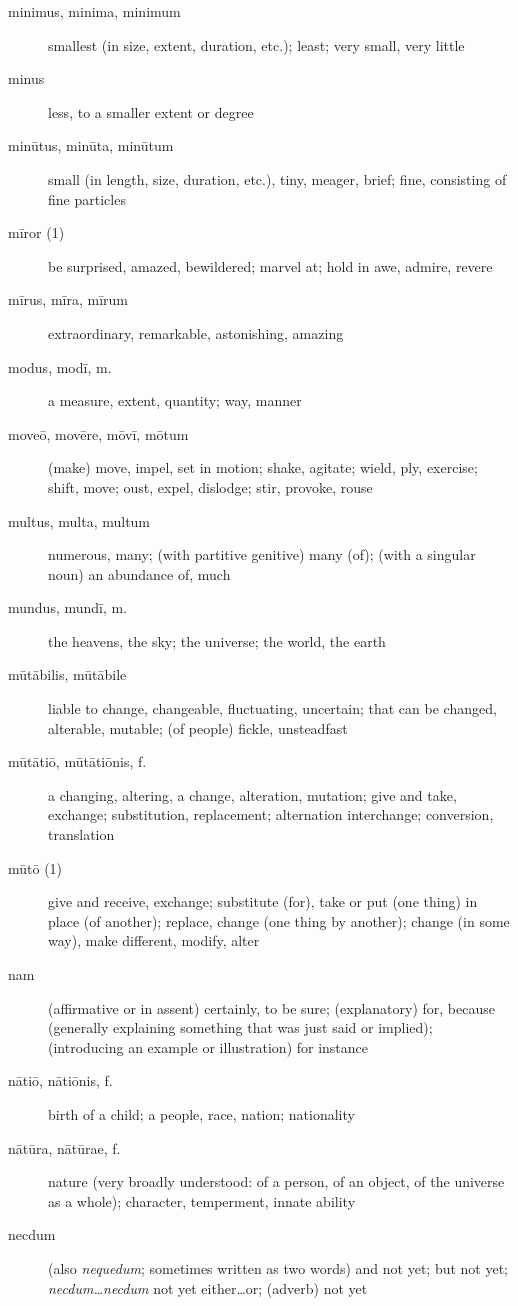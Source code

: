 \begin{description}
    \item[minimus, minima, minimum] smallest (in size, extent, duration, etc.); least; very small, very little
    \item[minus] less, to a smaller extent or degree
    \item[minūtus, minūta, minūtum] small (in length, size, duration, etc.), tiny, meager, brief; fine, consisting of fine particles
    \item[mīror (1)] be surprised, amazed, bewildered; marvel at; hold in awe, admire, revere
    \item[mīrus, mīra, mīrum] extraordinary, remarkable, astonishing, amazing
    \item[modus, modī, m.] a measure, extent, quantity; way, manner
    \item[moveō, movēre, mōvī, mōtum] (make) move, impel, set in motion; shake, agitate; wield, ply, exercise; shift, move; oust, expel, dislodge; stir, provoke, rouse
    \item[multus, multa, multum] numerous, many; (with partitive genitive) many (of); (with a singular noun) an abundance of, much
    \item[mundus, mundī, m.] the heavens, the sky; the universe; the world, the earth
    \item[mūtābilis, mūtābile] liable to change, changeable, fluctuating, uncertain; that can be changed, alterable, mutable; (of people) fickle, unsteadfast
    \item[mūtātiō, mūtātiōnis, f.] a changing, altering, a change, alteration, mutation; give and take, exchange; substitution, replacement; alternation interchange; conversion, translation
    \item[mūtō (1)] give and receive, exchange; substitute (for), take or put (one thing) in place (of another); replace, change (one thing by another); change (in some way), make different, modify, alter
    \item[nam] (affirmative or in assent) certainly, to be sure; (explanatory) for, because (generally explaining something that was just said or implied); (introducing an example or illustration) for instance
    \item[nātiō, nātiōnis, f.] birth of a child; a people, race, nation; nationality
    \item[nātūra, nātūrae, f.] nature (very broadly understood: of a person, of an object, of the universe as a whole); character, temperment, innate ability
    \item[necdum] (also \textit{nequedum}; sometimes written as two words) and not yet; but not yet; \textit{necdum\dots necdum} not yet either\dots or; (adverb) not yet

\end{description}
